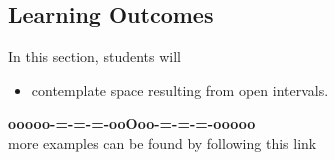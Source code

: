 \documentclass{ximera}
\begin{document}
\subsection*{Learning Outcomes}


\begin{sectionOutcomes}
In this section, students will 

\begin{itemize}
\item contemplate space resulting from open intervals.
\end{itemize}
\end{sectionOutcomes}


















\begin{onlineOnly}
\begin{center}
\textbf{\textcolor{green!50!black}{ooooo-=-=-=-ooOoo-=-=-=-ooooo}} \\

more examples can be found by following this link\\ 

\end{center}
\end{onlineOnly}
\end{document}

